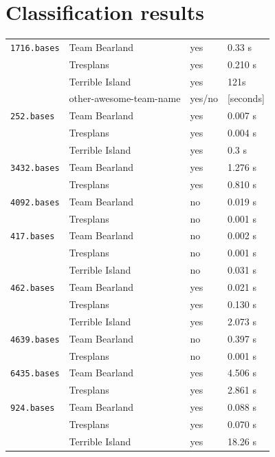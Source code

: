 \documentclass[11pt]{amsart}
\begin{document}
\section{Classification results}

\begin{center}
  \begin{tabular}[c]{llll}
    \hline
    \texttt{1716.bases}
    & Team Bearland
    & yes
    & 0.33 s
    \\
    & Tresplans
    & yes
    & 0.210 s
    \\
    & Terrible Island
    & yes
    & 121s
    \\
    & other-awesome-team-name
    & yes/no
    & [seconds]
    \\\hline
      \texttt{252.bases}
    & Team Bearland
    & yes
    & 0.007 s
    \\
    & Tresplans
    & yes
    & 0.004 s
    \\
    & Terrible Island
    & yes
    & 0.3 s
    \\\hline
      \texttt{3432.bases}
    & Team Bearland
    & yes
    & 1.276 s
    \\
    & Tresplans
    & yes
    & 0.810 s
    \\\hline
      \texttt{4092.bases}
    & Team Bearland
    & no
    & 0.019 s
    \\
    & Tresplans
    & no
    & 0.001 s
    \\\hline
      \texttt{417.bases}
    & Team Bearland
    & no
    & 0.002 s
    \\
    & Tresplans
    & no
    & 0.001 s
    \\
    & Terrible Island
    & no
    & 0.031 s
    \\\hline
      \texttt{462.bases}
    & Team Bearland
    & yes
    & 0.021 s
    \\
    & Tresplans
    & yes
    & 0.130 s
    \\
    & Terrible Island
    & yes
    & 2.073 s
    \\\hline
      \texttt{4639.bases}
    & Team Bearland
    & no
    & 0.397 s
    \\
    & Tresplans
    & no
    & 0.001 s
    \\\hline
    \texttt{6435.bases}
    & Team Bearland
    & yes
    & 4.506 s
    \\
    & Tresplans
    & yes
    & 2.861 s
    \\\hline
    \texttt{924.bases}
    & Team Bearland
    & yes
    & 0.088 s
    \\
    & Tresplans
    & yes
    & 0.070 s
    \\
    & Terrible Island
    & yes
    & 18.26 s
    \\\hline
  \end{tabular}
\end{center}
\end{document}
